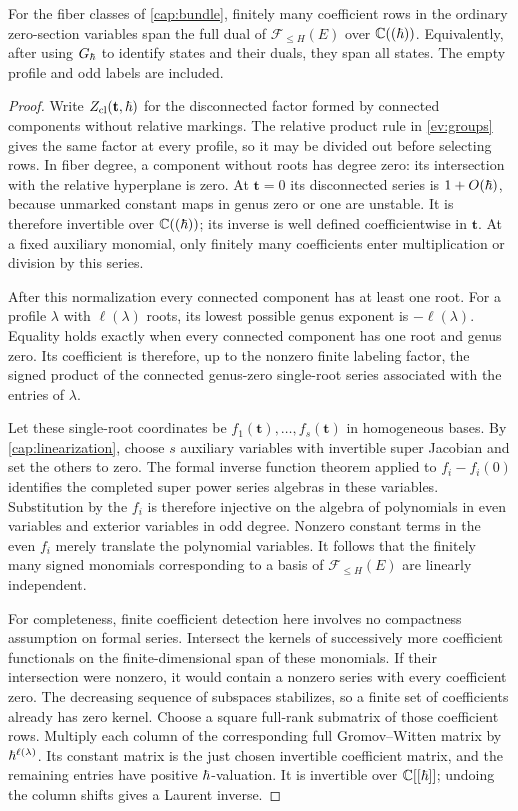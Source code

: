 \begin{lemma}\label{cap:span}
For the fiber classes of \eqref{cap:bundle}, finitely many coefficient
rows in the ordinary zero-section variables span the full dual of
$\mathcal F_{\leq H}(E)$ over $\mathbb C((\hbar))$.  Equivalently, after using
$G_{\hbar}$ to identify states and their duals, they span all states.
The empty profile and odd labels are included.
\end{lemma}
\begin{proof}
Write $Z_{\mathrm{cl}}(\mathbf t,\hbar)$ for the disconnected factor
formed by connected components without relative markings.  The
relative product rule in \cref{ev:groups} gives the same factor at
every profile, so it may be divided out before selecting rows.
In fiber degree, a component without roots has degree zero: its
intersection with the relative hyperplane is zero.  At $\mathbf t=0$
its disconnected series is $1+O(\hbar)$, because unmarked constant maps
in genus zero or one are unstable.  It is therefore invertible over
$\mathbb C((\hbar))$; its inverse is well defined coefficientwise in
$\mathbf t$.  At a fixed auxiliary monomial, only finitely many
coefficients enter multiplication or division by this series.

After this normalization every connected component has at least one
root.  For a profile $\lambda$ with $\ell(\lambda)$ roots, its
lowest possible genus exponent is $-\ell(\lambda)$.  Equality holds
exactly when every connected component has one root and genus zero.
Its coefficient is therefore, up to the nonzero finite labeling
factor, the signed product of the connected genus-zero single-root
series associated with the entries of $\lambda$.

Let these single-root coordinates be $f_1(\mathbf t),\ldots,
f_s(\mathbf t)$ in homogeneous bases.  By
\cref{cap:linearization}, choose $s$ auxiliary variables with invertible
super Jacobian and set the others to zero.  The formal inverse function
theorem applied to $f_i-f_i(0)$ identifies the completed super power
series algebras in these variables.  Substitution by the $f_i$ is
therefore injective on the algebra of polynomials in even variables
and exterior variables in odd degree.  Nonzero constant terms in the
even $f_i$ merely translate the polynomial variables.  It follows that
the finitely many signed monomials corresponding to a basis of
$\mathcal F_{\leq H}(E)$ are linearly independent.

For completeness, finite coefficient detection here involves no
compactness assumption on formal series.  Intersect the kernels of
successively more coefficient functionals on the finite-dimensional
span of these monomials.  If their intersection were nonzero, it would
contain a nonzero series with every coefficient zero.  The decreasing
sequence of subspaces stabilizes, so a finite set of coefficients
already has zero kernel.  Choose a square full-rank submatrix of those
coefficient rows.  Multiply each column of the corresponding full
Gromov--Witten matrix by $\hbar^{\ell(\lambda)}$.  Its constant matrix
is the just chosen invertible coefficient matrix, and the remaining
entries have positive $\hbar$-valuation.  It is invertible over
$\mathbb C[[\hbar]]$; undoing the column shifts gives a Laurent inverse.


\end{proof}
